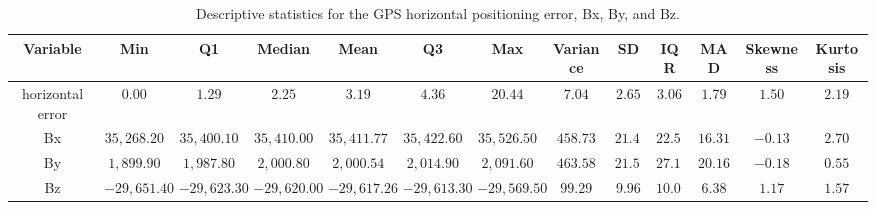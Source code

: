 \vspace{-3pt}
\begin{table}[H]
\caption{Descriptive statistics for the GPS horizontal positioning error, Bx, By, and Bz.\label{tab:Descriptive_Statistics_GPS_Bxyz}}
\begin{tabularx}{\textwidth}{CCCCCCCCCCCCC}
\toprule
\textbf{Variable} & \textbf{Min} & \textbf{Q1} & \textbf{Median} & \textbf{Mean} & \textbf{Q3} & \textbf{Max} & \textbf{Variance} & \textbf{SD} & \textbf{IQR} & \textbf{MAD} & \textbf{Skewness} & \textbf{Kurtosis} \\
\midrule
horizontal error & $0.00$ & $1.29$ & $2.25$ & $3.19$ & $4.36$ & $20.44$ & $7.04$ & $2.65$ & $3.06$ & $1.79$ & $1.50$ & $2.19$ \\
Bx & $35,268.20$ & $35,400.10$ & $35,410.00$ & $35,411.77$ & $35,422.60$ & $35,526.50$ & $458.73$ & $21.42$ & $22.50$ & $16.31$ & $-0.13$ & $2.70$ \\
By & $1,899.90$ & $1,987.80$ & $2,000.80$ & $2,000.54$ & $2,014.90$ & $2,091.60$ & $463.58$ & $21.53$ & $27.10$ & $20.16$ & $-0.18$ & $0.55$ \\
Bz & $-29,651.40$ & $-29,623.30$ & $-29,620.00$ & $-29,617.26$ & $-29,613.30$ & $-29,569.50$ & $99.29$ & $9.96$ & $10.00$ & $6.38$ & $1.17$ & $1.57$ \\
\bottomrule
\end{tabularx}
\end{table}
\vspace{-3pt}
